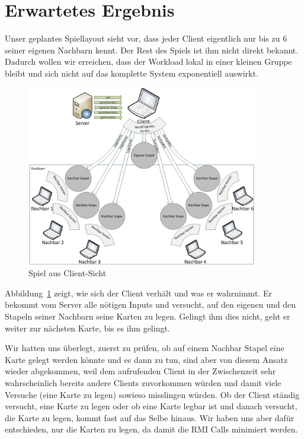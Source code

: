 \section{Erwartetes Ergebnis} 

Unser geplantes Spiellayout sieht vor, dass jeder Client eigentlich nur bis zu 6 seiner eigenen Nachbarn kennt. Der Rest des Spiels ist ihm nicht direkt bekannt. Dadurch wollen wir erreichen, dass der Workload lokal in einer kleinen Gruppe bleibt und sich nicht auf das komplette System exponentiell auswirkt.

\begin{figure}[hbt]
  \centering
  \includegraphics[width=0.9\textwidth,angle=0]{graphics/SpielLayout.png}
  \caption{Spiel aus Client-Sicht \hfill{} }
  \label{ergebnisspiellayout}
\end{figure}

Abbildung~\ref{ergebnisspiellayout} zeigt, wie sich der Client verhält und was er wahrnimmt. Er bekommt vom Server alle nötigen Inputs und versucht, auf den eigenen und den Stapeln seiner Nachbarn seine Karten zu legen. Gelingt ihm dies nicht, geht er weiter zur nächsten Karte, bis es ihm gelingt. 

Wir hatten uns überlegt, zuerst zu prüfen, ob auf einem Nachbar Stapel eine Karte gelegt werden könnte und es dann zu tun, sind aber von diesem Ansatz wieder abgekommen, weil dem aufrufenden Client in der Zwischenzeit sehr wahrscheinlich bereits andere Clients zuvorkommen würden und damit viele Versuche (eine Karte zu legen) sowieso misslingen würden. Ob der Client ständig versucht, eine Karte zu legen oder ob eine Karte legbar ist und danach versucht, die Karte zu legen, kommt fast auf das Selbe hinaus. Wir haben uns aber dafür entschieden, nur die Karten zu legen, da damit die RMI Calls minimiert werden.

